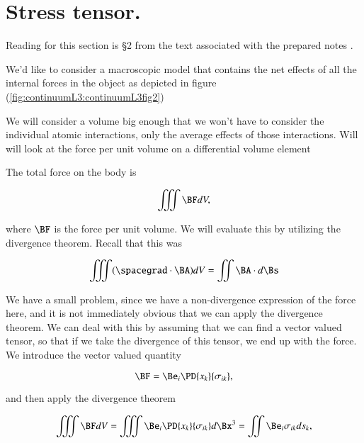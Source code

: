 \section{Stress tensor.}

Reading for this section is \S 2 from the text associated with the prepared notes \cite{landau1960theory}.

We'd like to consider a macroscopic model that contains the net effects of all the internal forces in the object as depicted in figure (\ref{fig:continuumL3:continuumL3fig2})


We will consider a volume big enough that we won't have to consider the individual atomic interactions, only the average effects of those interactions.  Will will look at the force per unit volume on a differential volume element

The total force on the body is 

\begin{equation}\label{eqn:continuumL3:230}
\iiint \BF dV,
\end{equation}

where $\BF$ is the force per unit volume.  We will evaluate this by utilizing the divergence theorem.  Recall that this was

\begin{equation}\label{eqn:continuumL3:250}
\iiint (\spacegrad \cdot \BA) dV
= \iint \BA \cdot d\Bs
\end{equation}

We have a small problem, since we have a non-divergence expression of the force here, and it is not immediately obvious that we can apply the divergence theorem.  We can deal with this by assuming that we can find a vector valued tensor, so that if we take the divergence of this tensor, we end up with the force.  We introduce the vector valued quantity

\begin{equation}\label{eqn:continuumL3:270}
\BF = \Be_i \PD{x_k}{\sigma_{ik}},
\end{equation}

and then apply the divergence theorem

\begin{equation}\label{eqn:continuumL3:290}
\iiint \BF dV 
= \iiint \Be_i \PD{x_k}{\sigma_{ik}} d\Bx^3 
=
\iint \Be_i \sigma_{ik} ds_k,
\end{equation}

